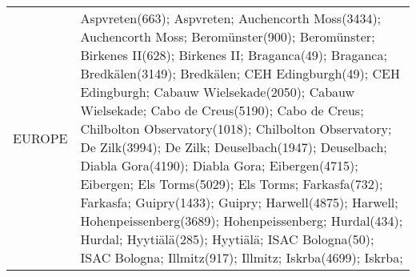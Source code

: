 \documentclass[journal abbreviation, manuscript]{copernicus}
\begin{document}
\begin{table}
\begin{tabularx}{\textwidth}{lX}
        EUROPE &                                                                                                                                                                                                                                                                                                                                                                                                                                                                                                                                                                                                                                                                                                                                                                                                                                                                                                                                                                                                                                                                                                                                                                                                                                                                                                                                                                                                                                                                                                                                                                                                                                                                                                                                                                                                                                                                                                                                                                                                                                                                                                                                                                                                                                                                                                                                                                                                                                                                                                                                                                                                                                          Aspvreten(663); Aspvreten; Auchencorth Moss(3434); Auchencorth Moss; Beromünster(900); Beromünster; Birkenes II(628); Birkenes II; Braganca(49); Braganca; Bredkälen(3149); Bredkälen; CEH Edingburgh(49); CEH Edingburgh; Cabauw Wielsekade(2050); Cabauw Wielsekade; Cabo de Creus(5190); Cabo de Creus; Chilbolton Observatory(1018); Chilbolton Observatory; De Zilk(3994); De Zilk; Deuselbach(1947); Deuselbach; Diabla Gora(4190); Diabla Gora; Eibergen(4715); Eibergen; Els Torms(5029); Els Torms; Farkasfa(732); Farkasfa; Guipry(1433); Guipry; Harwell(4875); Harwell; Hohenpeissenberg(3689); Hohenpeissenberg; Hurdal(434); Hurdal; Hyytiälä(285); Hyytiälä; ISAC Bologna(50); ISAC Bologna; Illmitz(917); Illmitz; Iskrba(4699); Iskrba; 
\end{tabularx}
\end{table}
\end{document}
